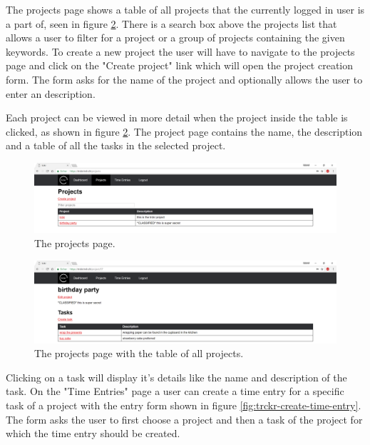 \documentclass[bibliography=totoc, listof=totocnumbered]{scrartcl}
\begin{document}
The projects page shows a table of all projects that the currently logged in
user is a part of, seen in figure \ref{fig:trckr-project-page}. There is a
search box above the projects list that allows a user to filter for a project or
a group of projects containing the given keywords. To create a new project the
user will have to navigate to the projects page and click on the "Create
project" link which will open the project creation form. %
The form asks for the name of the project and optionally allows the user to enter an
description.

Each project can be viewed in more detail when the project inside the table is
clicked, as shown in figure \ref{fig:trckr-project-page}. The project page
contains the name, the description and a table of all the tasks in the selected
project.

\begin{figure}[h]
    \includegraphics[width=\textwidth]{trckr-projects-table}
    \caption{The projects page.}
    \label{fig:trckr-projects-table}
\end{figure}

\begin{figure}[h]
    \includegraphics[width=\textwidth]{trckr-project-page}
    \caption{The projects page with the table of all projects.}
    \label{fig:trckr-project-page}
\end{figure}

Clicking on a task will display it's details like the name and description of
the task. On the "Time Entries" page a user can create a time entry for a
specific task of a project with the entry form shown in figure
\ref{fig:trckr-create-time-entry}. The form asks the user to first choose a
project and then a task of the project for which the time entry should be
created.
\end{document}
